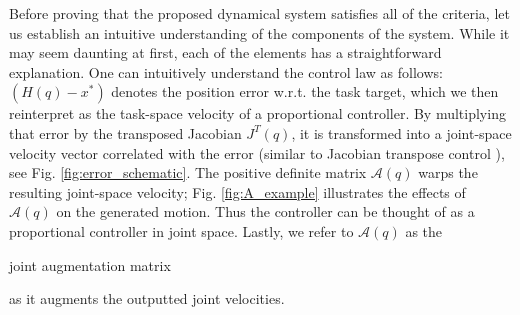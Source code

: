 \documentclass[letterpaper, 10 pt, conference,fleqn]{ieeeconf}
\begin{document}
Before proving that the proposed dynamical system satisfies all of the criteria, let us establish an intuitive understanding of the components of the system. While it may seem daunting at first, each of the elements has a straightforward explanation. One can intuitively understand the control law as follows: $(H(q) - x^*)$ denotes the position error w.r.t. the task target, which we then reinterpret as the task-space velocity of a proportional controller. By multiplying that error by the transposed Jacobian $J^T(q)$, it is transformed into a joint-space velocity vector correlated with the error (similar to Jacobian transpose control \cite{wolovich1984computational,sciavicco1988solution}), see Fig. \ref{fig:error_schematic}. The positive definite matrix $\mathcal{A}(q)$ warps the resulting joint-space velocity; Fig. \ref{fig:A_example} illustrates the effects of  $\mathcal{A}(q)$ on the generated motion. Thus the controller can be thought of as a proportional controller in joint space. Lastly, we refer to %
$\mathcal{A}(q)$ as the \begin{bf} joint augmentation matrix \end{bf} as it augments the outputted joint velocities.
\end{document}
